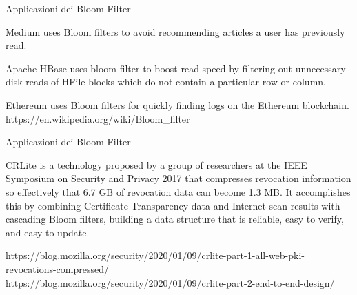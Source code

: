 \begin{frame}{Applicazioni dei Bloom Filter}


\begin{myboxtitle}
\BI
\item \alert{Medium} uses Bloom filters to avoid recommending articles a user has previously read.
\item \alert{Apache HBase} uses bloom filter to boost read speed by filtering out unnecessary disk reads of HFile blocks which do not contain a particular row or column.
\item \alert{Ethereum} uses Bloom filters for quickly finding logs on the Ethereum blockchain.
\EI
\bigskip
\tiny{
https://en.wikipedia.org/wiki/Bloom\_filter
}
\end{myboxtitle}

	
\end{frame}

\begin{frame}{Applicazioni dei Bloom Filter}

\begin{myboxtitle}
CRLite is a technology proposed by a group of researchers at the IEEE Symposium on Security and Privacy 2017 that compresses revocation information so effectively that 6.7 GB of revocation data can become 1.3 MB. It accomplishes this by combining Certificate Transparency data and Internet scan results with cascading Bloom filters, building a data structure that is reliable, easy to verify, and easy to update.

\bigskip
\tiny{
https://blog.mozilla.org/security/2020/01/09/crlite-part-1-all-web-pki-revocations-compressed/ \\
https://blog.mozilla.org/security/2020/01/09/crlite-part-2-end-to-end-design/
}

\end{myboxtitle}
	
\end{frame}



